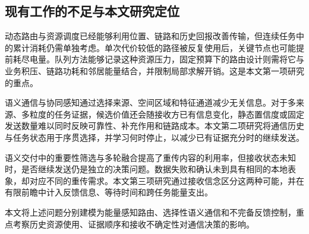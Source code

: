 \subsection{现有工作的不足与本文研究定位}

动态路由与资源调度已经能够利用位置、链路和历史回报改善传输，但连续任务中的累计消耗仍需单独考虑。单次代价较低的路径被反复使用后，关键节点也可能提前耗尽电量。队列方法能够记录这种资源压力，固定预算下的路由设计则需将它与业务积压、链路功耗和邻居能量结合，并限制局部求解开销。这是本文第一项研究的重点。

语义通信与协同感知通过选择来源、空间区域和特征通道减少无关信息。对于多来源、多粒度的任务证据，候选价值还会随接收方已有信息变化，静态置信度或固定发送数量难以同时反映可靠性、补充作用和链路成本。本文第二项研究将通信历史与任务状态用于序贯选择，并学习何时停止，以减少已有证据充分时的继续发送。

语义交付中的重要性筛选与多轮融合提高了重传内容的利用率，但接收状态未知时，是否继续发送仍是独立的决策问题。数据失败和确认未到具有相同的本地表象，却对应不同的重传需求。本文第三项研究通过接收信念区分这两种可能，并在有限前瞻中计入反馈信息、等待时间和跨任务能量支出。

本文将上述问题分别建模为能量感知路由、选择性语义通信和不完备反馈控制，重点考察历史资源使用、证据顺序和接收不确定性对通信决策的影响。

